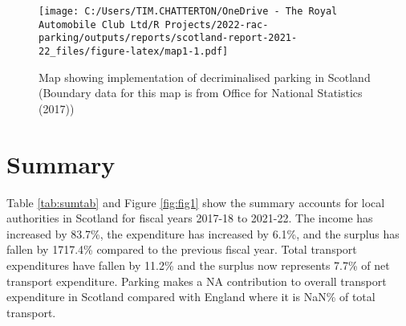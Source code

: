 \documentclass[
  12pt,
]{article}
\begin{document}
\begin{figure}
\centering
\texttt{[image: C:/Users/TIM.CHATTERTON/OneDrive - The Royal Automobile Club Ltd/R Projects/2022-rac-parking/outputs/reports/scotland-report-2021-22\_files/figure-latex/map1-1.pdf]}
\caption{\label{fig:map1}Map showing implementation of decriminalised parking in Scotland (Boundary data for this map is from Office for National Statistics (2017))}
\end{figure}

\hypertarget{summary}{%
\section{Summary}\label{summary}}

Table \ref{tab:sumtab} and Figure \ref{fig:fig1} show the summary accounts for local authorities in Scotland for fiscal years 2017-18 to 2021-22. The income has
increased by 83.7\%, the expenditure has
increased by 6.1\%, and the surplus has
fallen by 1717.4\%
compared to the previous fiscal year. Total transport expenditures have
fallen by 11.2\% and the surplus now represents 7.7\% of net transport expenditure. Parking makes a
NA contribution to overall transport expenditure in Scotland compared with England where it is NaN\% of total transport.

\newpage

\begingroup\fontsize{10}{12}\selectfont
\end{document}
